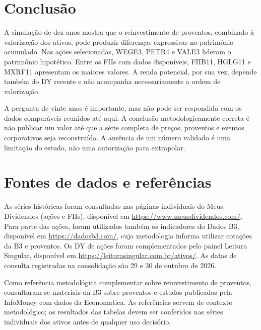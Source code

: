 \documentclass[11pt,a4paper]{article}
\begin{document}
\section{Conclusão}

A simulação de dez anos mostra que o reinvestimento de proventos, combinado à valorização dos ativos, pode produzir diferenças expressivas no patrimônio acumulado. Nas ações selecionadas, WEGE3, PETR4 e VALE3 lideram o patrimônio hipotético. Entre os FIIs com dados disponíveis, FIIB11, HGLG11 e MXRF11 apresentam os maiores valores. A renda potencial, por sua vez, depende também do DY recente e não acompanha necessariamente a ordem de valorização.

A pergunta de vinte anos é importante, mas não pode ser respondida com os dados comparáveis reunidos até aqui. A conclusão metodologicamente correta é não publicar um valor até que a série completa de preços, proventos e eventos corporativos seja reconstruída. A ausência de um número validado é uma limitação do estudo, não uma autorização para extrapolar.

\section*{Fontes de dados e referências}

As séries históricas foram consultadas nas páginas individuais do Meus Dividendos (ações e FIIs), disponível em \url{https://www.meusdividendos.com/}. Para parte das ações, foram utilizados também os indicadores do Dados B3, disponível em \url{https://dadosb3.com/}, cuja metodologia informa utilizar cotações da B3 e proventos. Os DY de ações foram complementados pelo painel Leitura Singular, disponível em \url{https://leiturasingular.com.br/ativos/}. As datas de consulta registradas na consolidação são 29 e 30 de outubro de 2026.

Como referência metodológica complementar sobre reinvestimento de proventos, consultaram-se materiais da B3 sobre proventos e estudos publicados pela InfoMoney com dados da Economatica. As referências servem de contexto metodológico; os resultados das tabelas devem ser conferidos nas séries individuais dos ativos antes de qualquer uso decisório.
\end{document}
